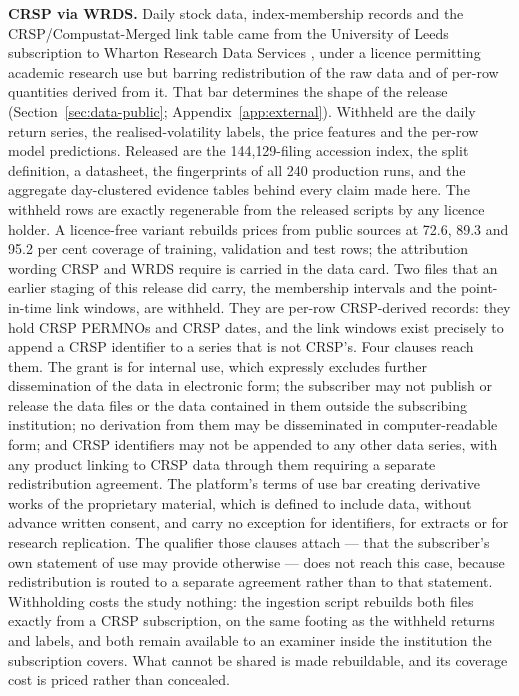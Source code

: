 \textbf{CRSP via WRDS.} Daily stock data, index-membership records and the CRSP/Compustat-Merged link table came from the University of Leeds subscription to Wharton Research Data Services \cite{crsp2026data}, under a licence permitting academic research use but barring redistribution of the raw data and of per-row quantities derived from it. That bar determines the shape of the release (Section~\ref{sec:data-public}; Appendix~\ref{app:external}). Withheld are the daily return series, the realised-volatility labels, the price features and the per-row model predictions. Released are the 144{,}129-filing accession index, the split definition, a datasheet, the fingerprints of all 240 production runs, and the aggregate day-clustered evidence tables behind every claim made here. %
The withheld rows are exactly regenerable from the released scripts by any licence holder. A licence-free variant rebuilds prices from public sources at 72.6, 89.3 and 95.2 per cent coverage of training, validation and test rows; %
the attribution wording CRSP and WRDS require is carried in the data card.
Two files that an earlier staging of this release did carry, the membership
intervals and the point-in-time link windows, are withheld. They are per-row
CRSP-derived records: they hold CRSP PERMNOs and CRSP dates, and the link windows
exist precisely to append a CRSP identifier to a series that is not
CRSP's. %
Four clauses reach them. The grant is for internal use, which expressly excludes
further dissemination of the data in electronic form; the subscriber may not
publish or release the data files or the data contained in them outside the
subscribing institution; no derivation from them may be disseminated in
computer-readable form; and CRSP identifiers may not be appended to any other
data series, with any product linking to CRSP data through them requiring a
separate redistribution agreement. The platform's terms of use bar creating
derivative works of the proprietary material, which is defined to include data,
without advance written consent, and carry no exception for identifiers, for
extracts or for research replication. The qualifier those clauses attach --- that
the subscriber's own statement of use may provide otherwise --- does not reach
this case, because redistribution is routed to a separate agreement rather than to
that statement. Withholding costs the study nothing: the ingestion script rebuilds
both files exactly from a CRSP subscription, on the same footing as the withheld
returns and labels, and both remain available to an examiner inside the
institution the subscription covers. %
What cannot be shared is made rebuildable, and its coverage cost is priced rather
than concealed.


